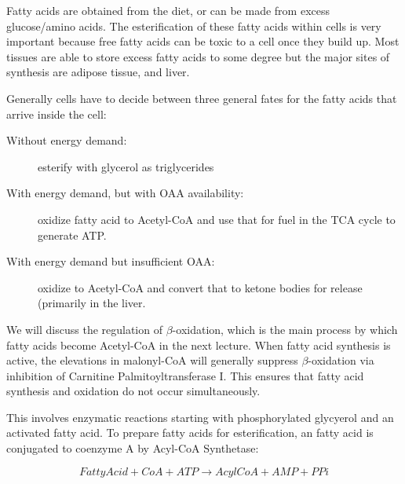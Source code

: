 \documentclass{tufte-handout}
\begin{document}
Fatty acids are obtained from the diet, or can be made from excess glucose/amino acids.  The esterification of these fatty acids within cells is very important because free fatty acids can be toxic to a cell once they build up.  Most tissues are able to store excess fatty acids to some degree but the major sites of synthesis are adipose tissue, and liver.

Generally cells have to decide between three general fates for the fatty acids that arrive inside the cell:
\begin{description}
\item [Without energy demand:] esterify with glycerol as triglycerides
\item [With energy demand, but with OAA availability:] oxidize fatty acid to Acetyl-CoA and use that for fuel in the TCA cycle to generate ATP.
\item [With energy demand but insufficient OAA:] oxidize to Acetyl-CoA and convert that to ketone bodies for release (primarily in the liver.
\end{description}

We will discuss the regulation of $\beta$-oxidation, which is the main process by which fatty acids become Acetyl-CoA in the next lecture.  When fatty acid synthesis is active, the elevations in malonyl-CoA will generally suppress $\beta$-oxidation via inhibition of Carnitine Palmitoyltransferase I.  This ensures that fatty acid synthesis and oxidation do not occur simultaneously.

  This involves enzymatic reactions starting with phosphorylated glycyerol and an activated fatty acid.  To prepare fatty acids for esterification, an fatty acid is conjugated to coenzyme A by Acyl-CoA Synthetase:

\begin{equation}
Fatty Acid + CoA +  ATP \rightarrow AcylCoA + AMP + PPi
\end{equation}
\end{document}
